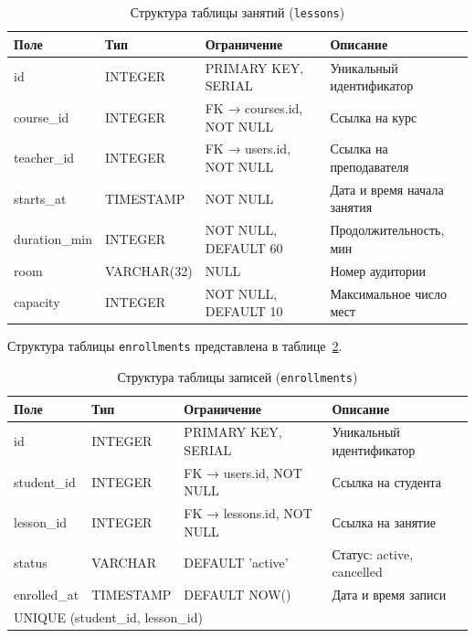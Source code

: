 \begin{table}[ht!]
    \centering
    \caption{Структура таблицы занятий (\texttt{lessons})}
    \label{tab:db_lessons}
    \small
    \begin{tabularx}{\textwidth}{|p{3.0cm}|p{2.5cm}|p{3.5cm}|X|}
        \hline
        \textbf{Поле} & \textbf{Тип} & \textbf{Ограничение} & \textbf{Описание} \\ \hline
        id           & INTEGER   & PRIMARY KEY, SERIAL      & Уникальный идентификатор \\ \hline
        course\_id   & INTEGER   & FK → courses.id, NOT NULL & Ссылка на курс \\ \hline
        teacher\_id  & INTEGER   & FK → users.id, NOT NULL  & Ссылка на преподавателя \\ \hline
        starts\_at   & TIMESTAMP & NOT NULL                 & Дата и время начала занятия \\ \hline
        duration\_min & INTEGER  & NOT NULL, DEFAULT 60     & Продолжительность, мин \\ \hline
        room         & VARCHAR(32) & NULL                   & Номер аудитории \\ \hline
        capacity     & INTEGER   & NOT NULL, DEFAULT 10     & Максимальное число мест \\ \hline
    \end{tabularx}
\end{table}

Структура таблицы \texttt{enrollments} представлена в таблице~\ref{tab:db_enrollments}.

\begin{table}[ht!]
    \centering
    \caption{Структура таблицы записей (\texttt{enrollments})}
    \label{tab:db_enrollments}
    \small
    \begin{tabularx}{\textwidth}{|p{3.0cm}|p{2.5cm}|p{3.5cm}|X|}
        \hline
        \textbf{Поле} & \textbf{Тип} & \textbf{Ограничение} & \textbf{Описание} \\ \hline
        id          & INTEGER   & PRIMARY KEY, SERIAL                          & Уникальный идентификатор \\ \hline
        student\_id & INTEGER   & FK → users.id, NOT NULL                      & Ссылка на студента \\ \hline
        lesson\_id  & INTEGER   & FK → lessons.id, NOT NULL                    & Ссылка на занятие \\ \hline
        status      & VARCHAR   & DEFAULT 'active'                             & Статус: active, cancelled \\ \hline
        enrolled\_at & TIMESTAMP & DEFAULT NOW()                               & Дата и время записи \\ \hline
        \multicolumn{4}{|l|}{UNIQUE (student\_id, lesson\_id)} \\ \hline
    \end{tabularx}
\end{table}

